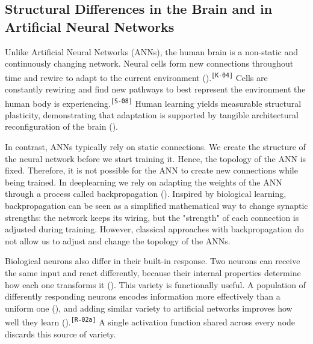 \documentclass[12pt]{article}
\newcommand{\revID}[1]{\textsuperscript{\scriptsize\texttt{[#1]}}}
\newcommand{\revStyle}[2]{\textcolor{revViolet}{#2}\revID{#1}}
\newcommand{\revRepeat}[2]{\textcolor{revTeal}{#2}\revID{#1}}
\newcommand{\revConsistency}[2]{\textcolor{revBlue}{#2}\revID{#1}}
\begin{document}
\subsection{Structural Differences in the Brain and in Artificial Neural Networks}
\label{subsec:structural-differences-in-the-brain-and}


Unlike Artificial Neural Networks (ANNs), the human brain is a non-static and continuously changing network.
\revConsistency{K-04}{Neural cells form new connections throughout time and rewire to adapt to the current environment (\cite{pascualleone_plastic_2005,holtmaat_experience-dependent_2009}).}
\revStyle{S-08}{Cells are constantly rewiring and find new pathways to best represent the environment the human body is experiencing.}
Human learning yields measurable structural plasticity, demonstrating that adaptation is supported by tangible architectural reconfiguration of the brain (\cite{draganski_changes_2004}).

In contrast, ANNs typically rely on static connections.
We create the structure of the neural network before we start training it.
Hence, the topology of the ANN is fixed.
Therefore, it is not possible for the ANN to create new connections while being trained.
In deeplearning we rely on adapting the weights of the ANN through a process called backpropagation (\cite{rumelhart_learning_1986}).
Inspired by biological learning, backpropagation can be seen as a simplified mathematical way to change synaptic strengths: the network keeps its wiring, but the "strength" of each connection is adjusted during training.
However, classical approaches with backpropagation do not allow us to adjust and change the topology of the ANNs.

Biological neurons also differ in their built-in response.
Two neurons can receive the same input and react differently, because their internal properties determine how each one transforms it (\cite{drion_ion_2015}).
This variety is functionally useful.
\revRepeat{R-02a}{A population of differently responding neurons encodes information more effectively than a uniform one (\cite{tripathy_intermediate_2013}), and adding similar variety to artificial networks improves how well they learn (\cite{perez-nieves_neural_2021}).}
A single activation function shared across every node discards this source of variety.



\end{document}
